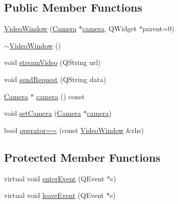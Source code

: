 \subsection*{Public Member Functions}
\begin{DoxyCompactItemize}
\item 
\hyperlink{classVideoWindow_a6867be437aebded8b690a9b95216df07}{Video\-Window} (\hyperlink{classCamera}{Camera} $\ast$\hyperlink{classVideoWindow_aa163a5850ff726c12f59562b993e4403}{camera}, Q\-Widget $\ast$parent=0)
\item 
\hyperlink{classVideoWindow_a3c5b83ed86071f9210388f0e06ac4876}{$\sim$\-Video\-Window} ()
\item 
void \hyperlink{classVideoWindow_ac71a3e790d6956a26369294d5fb36c93}{stream\-Video} (Q\-String url)
\item 
void \hyperlink{classVideoWindow_af5830c7faa6e46a69be02c93abc28d3a}{send\-Request} (Q\-String data)
\item 
\hyperlink{classCamera}{Camera} $\ast$ \hyperlink{classVideoWindow_aa163a5850ff726c12f59562b993e4403}{camera} () const 
\item 
void \hyperlink{classVideoWindow_a612b1b179b04ccebce717ff2fd95879e}{set\-Camera} (\hyperlink{classCamera}{Camera} $\ast$\hyperlink{classVideoWindow_aa163a5850ff726c12f59562b993e4403}{camera})
\item 
bool \hyperlink{classVideoWindow_af11854a41b4e79c396c04bc40789b46d}{operator==} (const \hyperlink{classVideoWindow}{Video\-Window} \&rhs)
\end{DoxyCompactItemize}
\subsection*{Protected Member Functions}
\begin{DoxyCompactItemize}
\item 
virtual void \hyperlink{classVideoWindow_aba663642b1a2911fc83c366c50fc1378}{enter\-Event} (Q\-Event $\ast$e)
\item 
virtual void \hyperlink{classVideoWindow_a58ad769fa96f197fd1212a9cbf5984d1}{leave\-Event} (Q\-Event $\ast$e)
\end{DoxyCompactItemize}



